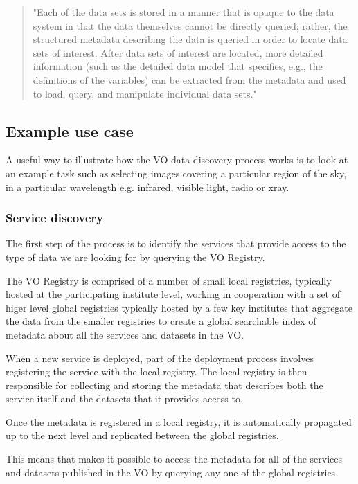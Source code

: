 \documentclass{article}
\begin{document}
\begin{quote}
"Each of the data sets is stored in a manner that is opaque to the data system in
that the data themselves cannot be directly queried; rather, the structured
metadata describing the data is queried in order to locate data sets of
interest. After data sets of interest are located, more detailed information
(such as the detailed data model that specifies, e.g., the definitions of the
variables) can be extracted from the metadata and used to load, query, and
manipulate individual data sets."
\end{quote}

\subsection{Example use case}

A useful way to illustrate how the VO data discovery process works is to look at
an example task such as selecting images covering a particular region of the
sky, in a particular wavelength e.g. infrared, visible light, radio or xray.

\subsubsection{Service discovery}

The first step of the process is to identify the services that provide access to
the type of data we are looking for by querying the VO Registry.

The VO Registry is comprised of a number of small local registries, typically
hosted at the participating institute level, working in cooperation with a set
of higer level global registries typically hosted by a few key institutes that
aggregate the data from the smaller registries to create a global searchable
index of metadata about all the services and datasets in the VO.

When a new service is deployed, part of the deployment process involves
registering the service with the local registry. The local registry is then
responsible for collecting and storing the metadata that describes both the
service itself and the datasets that it provides access to.

Once the metadata is registered in a local registry, it is automatically
propagated up to the next level and replicated between the global registries.

This means that makes it possible to access the metadata for all of the
services and datasets published in the VO by querying any one of the global
registries.
\end{document}
